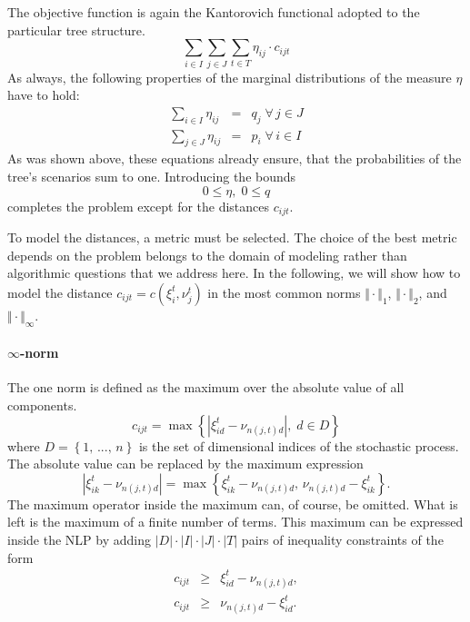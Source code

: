 The objective function is again the Kantorovich functional adopted to the particular tree structure.
\begin{equation}
  \label{eq:NLP-derivation-objective}
  \sum_{i\in I}\sum_{j\in J}\sum_{t\in T} \eta_{ij}\cdot c_{ijt}
\end{equation}
As always, the following properties of the marginal distributions of the measure $\eta$ have to hold:
\begin{eqnarray}
  \label{eq:eta-nlp-marginal-q}
  \sum_{i\in I}\eta_{ij} &=& q_j \;\forall\, j\in J\\
  \label{eq:eta-nlp-marginal-p}
  \sum_{j\in J}\eta_{ij} &=& p_i \;\forall\, i\in I
\end{eqnarray}
As was shown above, these equations already ensure, that the probabilities of the tree's scenarios sum to one. Introducing the bounds
\begin{equation}
  \label{eq:bounds-nlp-q-eta}
  0 \leq \eta,\; 0\leq q
\end{equation}
completes the problem except for the distances $c_{ijt}$.

To model the distances, a metric must be selected. The choice of the best metric depends on the problem belongs to the domain of modeling rather than algorithmic questions that we address here. In the following, we will show how to model the distance $c_{ijt}=c(\xi_i^t,\nu_j^t)$ in the most common norms $\Vert\cdot\Vert_1$, $\Vert\cdot\Vert_2$, and $\Vert\cdot\Vert_\infty$.
% 
\paragraph{$\infty$-norm} The one norm is defined as the maximum over the absolute value of all components. 
\begin{equation}
  \label{eq:max-c-definition}
  c_{ijt} = \max\left\{\left|\xi_{id}^t-\nu_{n(j,t)d}\right|,\; d\in D\right\}
\end{equation}
where $D=\left\{1,\, ...,\,n\right\}$ is the set of dimensional indices of the stochastic process. The absolute value can be replaced by the maximum expression
\begin{equation}
  \label{eq:abs-is-a-max}
  \left|\xi_{ik}^t-\nu_{n(j,t)d}\right| = \max\left\{\xi_{ik}^t-\nu_{n(j,t)d},\, \nu_{n(j,t)d}-\xi_{ik}^t\right\}.
\end{equation}
The maximum operator inside the maximum can, of course, be omitted. What is left is the maximum of a finite number of terms. This maximum can be expressed inside the NLP by adding $ |D| \cdot |I|\cdot |J|\cdot |T|$ pairs of inequality constraints of the form
\begin{eqnarray}
  \label{eq:c-as-inftynorm}
  c_{ijt} &\geq& \xi_{id}^t - \nu_{n(j,t)d},\\
  c_{ijt} &\geq& \nu_{n(j,t)d} - \xi_{id}^t.  
\end{eqnarray}
